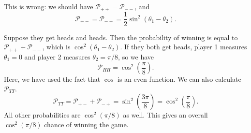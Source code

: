 This is wrong: we should have $\mathcal{P}_{++} =\mathcal{P}_{ - -} $, and
\[
	\mathcal{P}_{+-} =\mathcal{P}_{-+} =\frac{1}{2} \sin ^2(\theta _1-\theta _2)
.\]

Suppose they get heads and heads. Then the probability of winning is equal to $\mathcal{P}_{++} +\mathcal{P} _{- -} $, which is $\cos^2\left( \theta _1-\theta _2 \right) $. If they both get heads, player 1 measures $\theta _1=0$ and player 2 measures $\theta_2 = \pi /8$, so we have
\[
	\mathcal{P}_{HH} =\cos ^2\left( \frac{\pi }{8}  \right) 
.\]
Here, we have used the fact that $\cos $ is an even function. We can also calculate $\mathcal{P}_{TT} $.
\[
	\mathcal{P}_{TT} =\mathcal{P}_{+-} +\mathcal{P}_{-+} =\sin ^2\left( \frac{3\pi }{8}  \right) =\cos ^2\left( \frac{\pi }{8}  \right) 
.\]
All other probabilities are $\cos ^2(\pi /8)$ as well. This gives an overall $\cos ^2(\pi /8)$ chance of winning the game.

